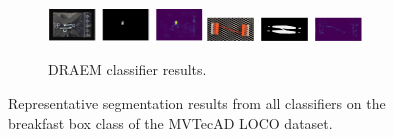 \begin{figure}[H]
\begin{subfigure}[b]{\textwidth}
    \end{subfigure}
    \begin{subfigure}[b]{\textwidth}
        \centering
        \includegraphics[width=0.45\textwidth]{figures/locoallapproaches/DRAEM/DRAEM_SB.png}
        \includegraphics[width=0.45\textwidth]{figures/locoallapproaches/DRAEM/DRAEM_SC.png}
        \caption{DRAEM \cite{Zavrtanik_2021DRAEM} classifier results.}

    \end{subfigure}
    
    \caption{Representative segmentation results from all classifiers on the breakfast box class of the MVTecAD LOCO \cite{LOCODentsAndScratchesBergmann2022} dataset.}
    \label{fig:locoallapproaches}
\end{figure}